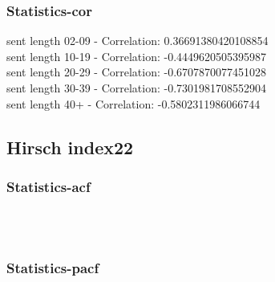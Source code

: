 \documentclass{article}%
\begin{document}
\subsubsection{Statistics{-}cor}%
\label{ssubsec:Statistics{-}cor}%
\noindent%
sent length 02-09 - Correlation: 0.36691380420108854\\%
sent length 10-19 - Correlation: -0.4449620505395987\\%
sent length 20-29 - Correlation: -0.6707870077451028\\%
sent length 30-39 - Correlation: -0.7301981708552904\\%
sent length 40+ - Correlation: -0.5802311986066744\\

%
\newpage

%
\subsection{Hirsch index22}%
\label{subsec:Hirschindex22}%
\subsubsection{Statistics{-}acf}%
\label{ssubsec:Statistics{-}acf}%


\begin{figure}[ht]%
\centering%
\setlength{\abovecaptionskip}{-35pt}%
%
%
\\%
%
%
\\%
%
\end{figure}

%
\newpage%
\subsubsection{Statistics{-}pacf}%
\label{ssubsec:Statistics{-}pacf}%
\end{document}
